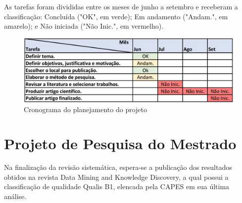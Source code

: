 \documentclass[smallextended]{svjour3}       %
\begin{document}
As tarefas foram divididas entre os meses de junho a setembro e receberam a classificação: Concluída ("OK", em verde); Em andamento ("Andam.", em amarelo); e Não iniciada ("Não Inic.", em vermelho). 

\begin{figure}[!ht]
	\centering
	\includegraphics[width=1\textwidth]{imagens/cronograma.jpg}
	\caption{Cronograma do planejamento do projeto}
	\label{fig:cronograma}
\end{figure}
	
\section{Projeto de Pesquisa do Mestrado}
\label{sec:5}

Na finalização da revisão sistemática, espera-se a publicação dos resultados obtidos na revista Data Mining and Knowledge Discovery, a qual possui a classificação de qualidade Qualis B1, elencada pela CAPES em sua última análise. 

	
\end{document}
